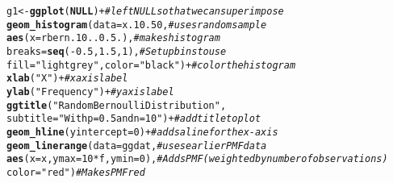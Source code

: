 \documentclass{article}\usepackage[]{graphicx}\usepackage[]{color}
\makeatletter
\newcommand{\hlnum}[1]{\textcolor[rgb]{0.686,0.059,0.569}{#1}}%
\newcommand{\hlstr}[1]{\textcolor[rgb]{0.192,0.494,0.8}{#1}}%
\newcommand{\hlcom}[1]{\textcolor[rgb]{0.678,0.584,0.686}{\textit{#1}}}%
\newcommand{\hlopt}[1]{\textcolor[rgb]{0,0,0}{#1}}%
\newcommand{\hlstd}[1]{\textcolor[rgb]{0.345,0.345,0.345}{#1}}%
\newcommand{\hlkwa}[1]{\textcolor[rgb]{0.161,0.373,0.58}{\textbf{#1}}}%
\newcommand{\hlkwb}[1]{\textcolor[rgb]{0.69,0.353,0.396}{#1}}%
\newcommand{\hlkwc}[1]{\textcolor[rgb]{0.333,0.667,0.333}{#1}}%
\newcommand{\hlkwd}[1]{\textcolor[rgb]{0.737,0.353,0.396}{\textbf{#1}}}%
\newenvironment{kframe}{%
 \def\at@end@of@kframe{}%
 \ifinner\ifhmode%
  \def\at@end@of@kframe{\end{minipage}}%
  \begin{minipage}{\columnwidth}%
 \fi\fi%
 \def\FrameCommand##1{\hskip\@totalleftmargin \hskip-\fboxsep
 \colorbox{shadecolor}{##1}\hskip-\fboxsep
     \hskip-\linewidth \hskip-\@totalleftmargin \hskip\columnwidth}%
 \MakeFramed {\advance\hsize-\width
   \@totalleftmargin\z@ \linewidth\hsize
   \@setminipage}}%
 {\par\unskip\endMakeFramed%
 \at@end@of@kframe}
\newenvironment{knitrout}{}{} %
\makeatother
\begin{document}
\begin{enumerate}
\begin{knitrout}
\begin{kframe}
\begin{alltt}
\hlstd{g1}\hlkwb{<-}\hlkwd{ggplot}\hlstd{(}\hlkwa{NULL}\hlstd{)} \hlopt{+}                                      \hlcom{#left NULL so that we can superimpose}
  \hlkwd{geom_histogram}\hlstd{(}\hlkwc{data}\hlstd{=x.10.50,}                          \hlcom{#uses random sample}
                 \hlkwd{aes}\hlstd{(}\hlkwc{x}\hlstd{=rbern.10..0.5.),}                 \hlcom{#makes histogram}
                 \hlkwc{breaks}\hlstd{=}\hlkwd{seq}\hlstd{(}\hlopt{-}\hlnum{0.5}\hlstd{,}\hlnum{1.5}\hlstd{,}\hlnum{1}\hlstd{),}                \hlcom{#Set up bins to use}
                 \hlkwc{fill} \hlstd{=} \hlstr{"lightgrey"}\hlstd{,} \hlkwc{color}\hlstd{=}\hlstr{"black"}\hlstd{)} \hlopt{+}   \hlcom{#color the histogram}
  \hlkwd{xlab}\hlstd{(}\hlstr{"X"}\hlstd{)} \hlopt{+}                                           \hlcom{#x axis label}
  \hlkwd{ylab}\hlstd{(}\hlstr{"Frequency"}\hlstd{)}\hlopt{+}                                    \hlcom{#y axis label}
  \hlkwd{ggtitle}\hlstd{(}\hlstr{"Random Bernoulli Distribution"}\hlstd{,}
          \hlkwc{subtitle} \hlstd{=} \hlstr{"With p=0.5 and n=10"}\hlstd{)} \hlopt{+}           \hlcom{#add title to plot}
  \hlkwd{geom_hline}\hlstd{(}\hlkwc{yintercept}\hlstd{=}\hlnum{0}\hlstd{)} \hlopt{+}                            \hlcom{#adds a line for the x-axis}
  \hlkwd{geom_linerange}\hlstd{(}\hlkwc{data}\hlstd{=ggdat,}                            \hlcom{#uses earlier PMF data}
                 \hlkwd{aes}\hlstd{(}\hlkwc{x}\hlstd{=x,} \hlkwc{ymax}\hlstd{=}\hlnum{10}\hlopt{*}\hlstd{f,} \hlkwc{ymin}\hlstd{=}\hlnum{0}\hlstd{),}           \hlcom{#Adds PMF (weighted by number of observations)}
                 \hlkwc{color}\hlstd{=}\hlstr{"red"}\hlstd{)}                           \hlcom{#Makes PMF red}


\end{alltt}
\end{kframe}
\end{knitrout}
\end{enumerate}
\end{document}
